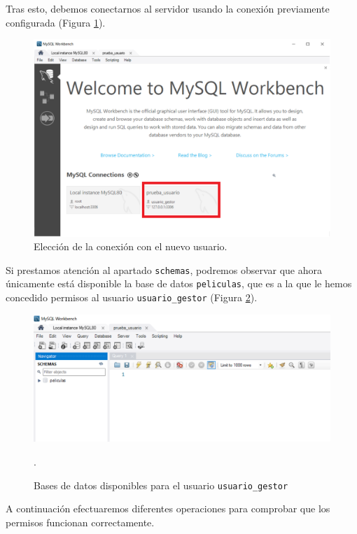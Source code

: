 \documentclass{db-practice}
\begin{document}
Tras esto, debemos conectarnos al servidor usando la conexión previamente configurada (Figura \ref{fig:eleccion-conexion}).

\begin{figure}[H]
    \centering
    \includegraphics[width=\textwidth]{figs/gestion-usuarios/elegir_conexion_usr.PNG}
    \caption{Elección de la conexión con el nuevo usuario.}
    \label{fig:eleccion-conexion}
\end{figure}

Si prestamos atención al apartado \texttt{schemas}, podremos observar que ahora únicamente está disponible la base de datos \texttt{peliculas}, que es a la que le hemos concedido permisos al usuario \texttt{usuario\_gestor} (Figura \ref{fig:bbdd-disp}).

\begin{figure}[H]
    \centering
    \includegraphics[width=\textwidth]{figs/gestion-usuarios/schemas_disponibles_usr.PNG}
    \caption{Bases de datos disponibles para el usuario \texttt{usuario\_gestor}}.
    \label{fig:bbdd-disp}
\end{figure}

A continuación efectuaremos diferentes operaciones para comprobar que los permisos funcionan correctamente.
\end{document}
